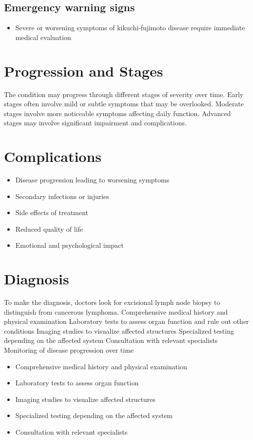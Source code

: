 \subsection{Emergency warning signs}
\begin{itemize}[noitemsep]
  \item Severe or worsening symptoms of kikuchi-fujimoto disease require immediate medical evaluation
\end{itemize}
\section{Progression and Stages}
The condition may progress through different stages of severity over time. Early stages often involve mild or subtle symptoms that may be overlooked. Moderate stages involve more noticeable symptoms affecting daily function. Advanced stages may involve significant impairment and complications.
\section{Complications}
\begin{itemize}[noitemsep]
  \item Disease progression leading to worsening symptoms
  \item Secondary infections or injuries
  \item Side effects of treatment
  \item Reduced quality of life
  \item Emotional and psychological impact
\end{itemize}
\section{Diagnosis}
To make the diagnosis, doctors look for excisional lymph node biopsy to distinguish from cancerous lymphoma. Comprehensive medical history and physical examination Laboratory tests to assess organ function and rule out other conditions Imaging studies to visualize affected structures Specialized testing depending on the affected system Consultation with relevant specialists Monitoring of disease progression over time

\begin{itemize}[noitemsep]
  \item Comprehensive medical history and physical examination
  \item Laboratory tests to assess organ function
  \item Imaging studies to visualize affected structures
  \item Specialized testing depending on the affected system
  \item Consultation with relevant specialists
\end{itemize}
